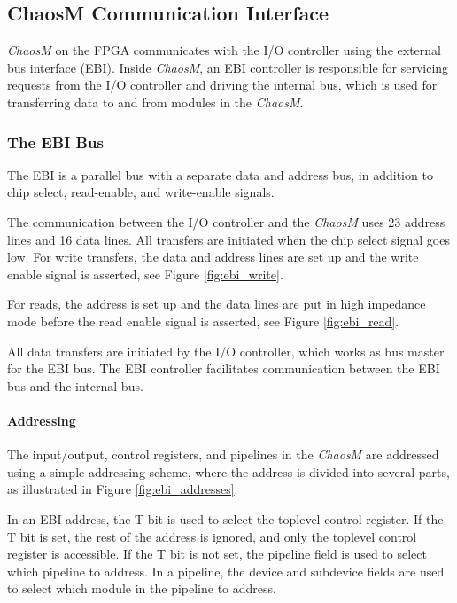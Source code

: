 
\FloatBarrier
\subsection{ChaosM Communication Interface}\label{section:fpga-buses}

\textit{ChaosM} on the FPGA communicates with the I/O controller using the external bus interface
(EBI). Inside \textit{ChaosM}, an EBI controller is responsible
for servicing requests from the I/O controller and driving the internal bus, which
is used for transferring data to and from modules in the \textit{ChaosM}.

\subsubsection{The EBI Bus}
The EBI\cite{efm_ebi} is a parallel bus with a separate data and address bus, in
addition to chip select, read-enable, and write-enable signals.

The communication between the I/O controller and the \textit{ChaosM} uses 23 address lines and 16 data
lines. All transfers are initiated when the chip select signal goes low. For
write transfers, the data and address lines are set up and the write enable
signal is asserted, see Figure \ref{fig:ebi_write}.

For reads, the address is set up and the data lines are put in high impedance mode
before the read enable signal is asserted, see Figure \ref{fig:ebi_read}.




All data transfers are initiated by the I/O controller, which works as bus
master for the EBI bus. The EBI controller facilitates communication between
the EBI bus and the internal bus.

\FloatBarrier
\paragraph{Addressing}

The input/output, control registers, and pipelines in the \textit{ChaosM} are addressed
using a simple addressing scheme, where the address is divided into several
parts, as illustrated in Figure \ref{fig:ebi_addresses}.



In an EBI address, the T bit is used to select the toplevel control register.
If the T bit is set, the rest of the address is ignored, and only the toplevel
control register is accessible. If the T bit is not set, the pipeline field is
used to select which pipeline to address. In a pipeline, the device
and subdevice fields are used to select which module in the pipeline to address.

